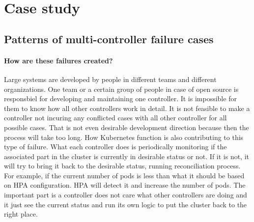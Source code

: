 \section{Case study}
\label{sec:case_study}
\subsection*{Patterns of multi-controller failure cases}

\paragraph*{How are these failures created?}
Large systems are developed by people in different teams and different organizations. One team or a certain group of people in case of open source is responsbiel for developing and maintaining one controller. It is impossible for them to know how all other controllers work in detail. It is not feasible to make a controller not incuring any conflicted cases with all other controller for all possible cases. That is not even desirable development direction because then the process will take too long.
How Kubernetes function is also contributing to this type of failure. What each controller does is periodically monitoring if the associated part in the cluster is currently in desirable status or not. If it is not, it will try to bring it back to the desirable status, running reconciliation process. For example, if the current number of pods is less than what it should be based on HPA configuration. HPA will detect it and increase the number of pods. The important part is a controller does not care what other controllers are doing and it just see the current status and run its own logic to put the cluster back to the right place.


